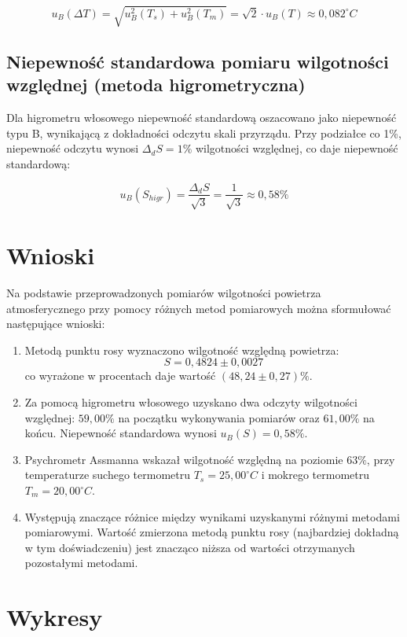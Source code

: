 \documentclass[a4paper,12pt]{article}
\begin{document}
\begin{equation}
    u_B(\Delta T) = \sqrt{u_B^2(T_s) + u_B^2(T_m)} = \sqrt{2} \cdot u_B(T) \approx 0{,}082^\circ C
\end{equation}


\subsection{Niepewność standardowa pomiaru wilgotności względnej (metoda higrometryczna)}

Dla higrometru włosowego niepewność standardową oszacowano jako niepewność typu B, wynikającą z dokładności odczytu skali przyrządu. Przy podziałce co 1\%, niepewność odczytu wynosi $\Delta_d S = 1\%$ wilgotności względnej, co daje niepewność standardową:

\begin{equation}
    u_B(S_{higr}) = \frac{\Delta_d S}{\sqrt{3}} = \frac{1}{\sqrt{3}} \approx 0{,}58\%
\end{equation}

\section{Wnioski}

Na podstawie przeprowadzonych pomiarów wilgotności powietrza atmosferycznego przy pomocy różnych metod pomiarowych można sformułować następujące wnioski:

\begin{enumerate}
    \item Metodą punktu rosy wyznaczono wilgotność względną powietrza:
          \begin{equation}
              S = 0{,}4824 \pm 0{,}0027
          \end{equation}
          co wyrażone w procentach daje wartość $(48{,}24 \pm 0{,}27)\%$.

    \item Za pomocą higrometru włosowego uzyskano dwa odczyty wilgotności względnej: $59{,}00\%$ na początku wykonywania pomiarów oraz $61{,}00\%$ na końcu. Niepewność standardowa wynosi $u_B(S) = 0{,}58\%$.

    \item Psychrometr Assmanna wskazał wilgotność względną na poziomie $63\%$, przy temperaturze suchego termometru $T_s = 25{,}00^\circ C$ i mokrego termometru $T_m = 20{,}00^\circ C$.

    \item Występują znaczące różnice między wynikami uzyskanymi różnymi metodami pomiarowymi. Wartość zmierzona metodą punktu rosy (najbardziej dokładną w tym doświadczeniu) jest znacząco niższa od wartości otrzymanych pozostałymi metodami.

\end{enumerate}

\section{Wykresy}



\end{document}
